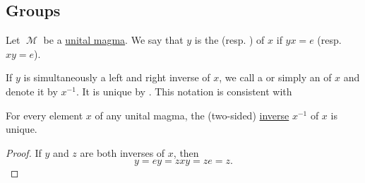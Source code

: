 \subsection{Groups}\label{subsec:groups}

\begin{definition}\label{def:unital_magma_inverse_element}
  Let \( \mscrM \) be a \hyperref[def:unital_magma]{unital magma}. We say that \( y \) is the  (resp. ) of \( x \) if \( yx = e \) (resp. \( xy = e \)).

  If \( y \) is simultaneously a left and right inverse of \( x \), we call a  or simply an  of \( x \) and denote it by \( x^{-1} \). It is unique by . This notation is consistent with 
\end{definition}

\begin{proposition}\label{def:unital_magma_inverse_element_unique}
  For every element \( x \) of any unital magma, the (two-sided) \hyperref[def:unital_magma_inverse_element]{inverse} \( x^{-1} \) of \( x \) is unique.
\end{proposition}
\begin{proof}
  If \( y \) and \( z \) are both inverses of \( x \), then
  \begin{equation*}
    y = ey = zxy = ze = z.
  \end{equation*}
\end{proof}

